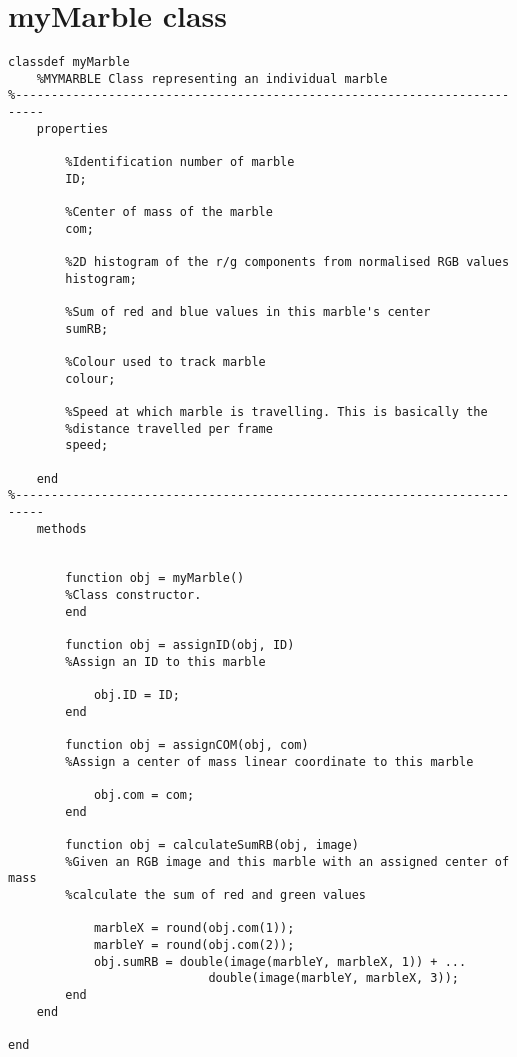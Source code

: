 \documentclass[10pt,a4paper,onecolumn]{report}
\begin{document}
\section{myMarble class}
\begin{lstlisting}
classdef myMarble
    %MYMARBLE Class representing an individual marble
%-------------------------------------------------------------------------- 
    properties
        
        %Identification number of marble
        ID;
        
        %Center of mass of the marble
        com;
        
        %2D histogram of the r/g components from normalised RGB values
        histogram;
        
        %Sum of red and blue values in this marble's center
        sumRB;
        
        %Colour used to track marble
        colour;
        
        %Speed at which marble is travelling. This is basically the
        %distance travelled per frame
        speed;

    end
%--------------------------------------------------------------------------    
    methods
        
        
        function obj = myMarble()
        %Class constructor.
        end
        
        function obj = assignID(obj, ID)
        %Assign an ID to this marble
        
            obj.ID = ID;
        end
        
        function obj = assignCOM(obj, com)
        %Assign a center of mass linear coordinate to this marble
            
            obj.com = com;
        end
        
        function obj = calculateSumRB(obj, image)
        %Given an RGB image and this marble with an assigned center of mass
        %calculate the sum of red and green values
        
            marbleX = round(obj.com(1));
            marbleY = round(obj.com(2));
            obj.sumRB = double(image(marbleY, marbleX, 1)) + ...
                            double(image(marbleY, marbleX, 3));
        end
    end
    
end
\end{lstlisting}
\end{document}
